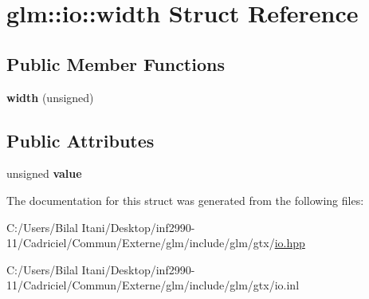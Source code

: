 \hypertarget{structglm_1_1io_1_1width}{}\section{glm\+:\+:io\+:\+:width Struct Reference}
\label{structglm_1_1io_1_1width}
\subsection*{Public Member Functions}
\begin{DoxyCompactItemize}
\item 
{\bfseries width} (unsigned)\hypertarget{structglm_1_1io_1_1width_a1576674b7e08dc5014ce4f41ac6eea5b}{}\label{structglm_1_1io_1_1width_a1576674b7e08dc5014ce4f41ac6eea5b}

\end{DoxyCompactItemize}
\subsection*{Public Attributes}
\begin{DoxyCompactItemize}
\item 
unsigned {\bfseries value}\hypertarget{structglm_1_1io_1_1width_a6bf1338eb947811d36ec93bd2e9b8425}{}\label{structglm_1_1io_1_1width_a6bf1338eb947811d36ec93bd2e9b8425}

\end{DoxyCompactItemize}


The documentation for this struct was generated from the following files\+:\begin{DoxyCompactItemize}
\item 
C\+:/\+Users/\+Bilal Itani/\+Desktop/inf2990-\/11/\+Cadriciel/\+Commun/\+Externe/glm/include/glm/gtx/\hyperlink{io_8hpp}{io.\+hpp}\item 
C\+:/\+Users/\+Bilal Itani/\+Desktop/inf2990-\/11/\+Cadriciel/\+Commun/\+Externe/glm/include/glm/gtx/io.\+inl\end{DoxyCompactItemize}
